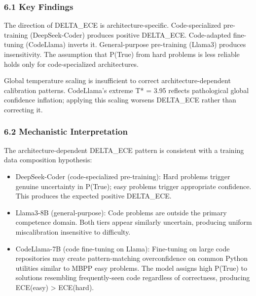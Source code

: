 
\subsubsection{6.1 Key Findings}

The direction of DELTA\_ECE is architecture-specific. Code-specialized pre-training (DeepSeek-Coder) produces positive DELTA\_ECE. Code-adapted fine-tuning (CodeLlama) inverts it. General-purpose pre-training (Llama3) produces insensitivity. The assumption that P(True) from hard problems is less reliable holds only for code-specialized architectures.

Global temperature scaling is insufficient to correct architecture-dependent calibration patterns. CodeLlama's extreme T* = 3.95 reflects pathological global confidence inflation; applying this scaling worsens DELTA\_ECE rather than correcting it.

\subsubsection{6.2 Mechanistic Interpretation}

The architecture-dependent DELTA\_ECE pattern is consistent with a training data composition hypothesis:

\begin{itemize}
\item DeepSeek-Coder (code-specialized pre-training): Hard problems trigger genuine uncertainty in P(True); easy problems trigger appropriate confidence. This produces the expected positive DELTA\_ECE.
\end{itemize}

\begin{itemize}
\item Llama3-8B (general-purpose): Code problems are outside the primary competence domain. Both tiers appear similarly uncertain, producing uniform miscalibration insensitive to difficulty.
\end{itemize}

\begin{itemize}
\item CodeLlama-7B (code fine-tuning on Llama): Fine-tuning on large code repositories may create pattern-matching overconfidence on common Python utilities similar to MBPP easy problems. The model assigns high P(True) to solutions resembling frequently-seen code regardless of correctness, producing ECE(easy) > ECE(hard).
\end{itemize}

